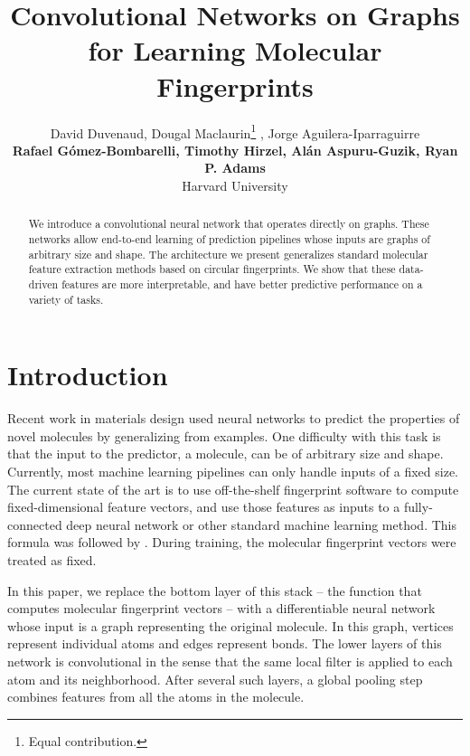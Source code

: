 \documentclass{article}
\title{Convolutional Networks on Graphs \\for Learning Molecular Fingerprints}
\author{
David Duvenaud, Dougal Maclaurin\thanks{Equal contribution.} , Jorge Aguilera-Iparraguirre \\ {\bf Rafael G\'omez-Bombarelli, Timothy Hirzel, Al\'an Aspuru-Guzik, Ryan P. Adams}\\
Harvard University}
\newcommand{\citet}{\cite}
\begin{document}
\maketitle

\begin{abstract}
We introduce a convolutional neural network that operates directly on graphs.
These networks allow end-to-end learning of prediction pipelines whose inputs are graphs of arbitrary size and shape.
The architecture we present generalizes standard molecular feature extraction methods based on circular fingerprints.
We show that these data-driven features are more interpretable, and have better predictive performance on a variety of tasks.
\end{abstract}

\section{Introduction}
Recent work in materials design used neural networks to predict the properties of novel molecules by generalizing from examples.
One difficulty with this task is that the input to the predictor, a molecule, can be of arbitrary size and shape.
Currently, most machine learning pipelines can only handle inputs of a fixed size.
The current state of the art is to use off-the-shelf fingerprint software to compute fixed-dimensional feature vectors, and use those features as inputs to a fully-connected deep neural network or other standard machine learning method.
This formula was followed by \citet{unterthinerdeep, dahl2014multi, ramsundar2015massively}.
During training, the molecular fingerprint vectors were treated as fixed.

In this paper, we replace the bottom layer of this stack -- the function that computes molecular fingerprint vectors -- with a differentiable neural network whose input is a graph representing the original molecule.
In this graph, vertices represent individual atoms and edges represent bonds.
The lower layers of this network is convolutional in the sense that the same local filter is applied to each atom and its neighborhood.
After several such layers, a global pooling step combines features from all the atoms in the molecule.
\end{document}
